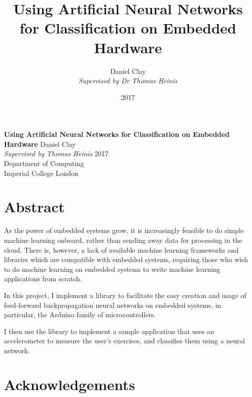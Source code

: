 \documentclass[a4paper]{article}
\begin{document}
\begin{titlepage}
    \centering
    \vfill
    {\huge \textbf{Using Artificial Neural Networks for Classification on Embedded Hardware}
        \vskip1cm
        \LARGE Daniel Clay  \\
        \vskip1cm
        \large \emph{Supervised by Thomas Heinis}
    }    
    \vfill
    \vfill
    \LARGE 2017\\
    \vfill
    \large Department of Computing\\
    Imperial College London
    \vfill
\end{titlepage}
\title{\textbf{Using Artificial Neural Networks for Classification on Embedded Hardware}}
\date{2017}
\author{
Daniel Clay\\
\emph{Supervised by Dr Thomas Heinis}\\ 
}

\pagebreak

\section{Abstract}
\label{sec:ab}

As the power of embedded systems grow, it is increasingly feasible to do simple machine learning onboard, rather than sending away data for processing in the cloud. 
There is, however, a lack of available machine learning frameworks and libraries which are compatible with embedded systems, requiring those who wish to do machine learning on embedded systems to write machine learning applications from scratch. 

In this project, I implement a library to facilitate the easy creation and usage of feed-forward backpropagation neural networks on embedded systems, in particular, the Arduino family of microcontrollers.

I then use the library to implement a sample application that uses an accelerometer to measure the user's exercises, and classifies them using a neural network.

\newpage
\section{Acknowledgements}
\label{sec:ak}
\end{document}
